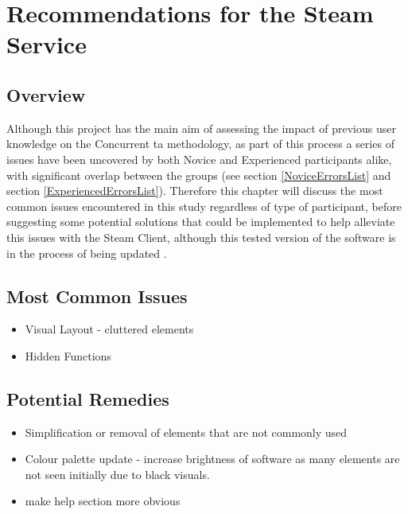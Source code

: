 \chapter{Recommendations for the Steam Service}
\section{Overview}
Although this project has the main aim of assessing the impact of previous user knowledge on the Concurrent \gls{ta} methodology, as part of this process a series of issues have been uncovered by both Novice and Experienced participants alike, with significant overlap between the groups (see section \ref{NoviceErrorsList} and section \ref{ExperiencedErrorsList}). Therefore this chapter will discuss the most common issues encountered in this study regardless of type of participant, before suggesting some potential solutions that could be implemented to help alleviate this issues with the Steam Client, although this tested version of the software is in the process of being updated \citep{pcGamerSteamUI2019}.

\section{Most Common Issues}
\begin{itemize}
    \item Visual Layout -  cluttered elements
    \item Hidden Functions
\end{itemize}

\section{Potential Remedies}
\begin{itemize}
    \item Simplification or removal of elements that are not commonly used
    \item Colour palette update - increase brightness of software as many elements are not seen initially due to black visuals.
    \item make help section more obvious
\end{itemize}

